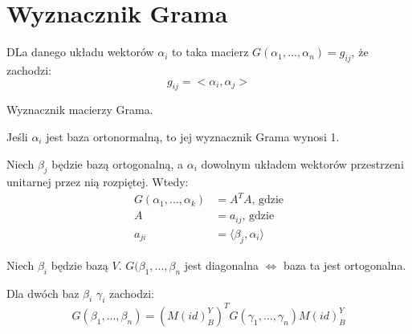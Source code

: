 \section{Wyznacznik Grama}



\begin{definition} 
    DLa danego układu wektorów $\alpha_i$ to taka macierz $G(\alpha_1, ..., \alpha_n) = g_{ij}$, że zachodzi:
    \[ g_{ij} = <\alpha_i, \alpha_j> \]
\end{definition}

\begin{definition} Wyznacznik macierzy Grama. \end{definition}

\begin{corollary}
    Jeśli $\alpha_i$ jest baza ortonormalną, to jej wyznacznik Grama wynosi 1.
\end{corollary}

\begin{statement}
    Niech $\beta_j$ będzie bazą ortogonalną, a $\alpha_i$ dowolnym układem wektorów przestrzeni unitarnej przez nią rozpiętej. Wtedy:
    \begin{align*}
        G(\alpha_1, ..., \alpha_k) &= A^TA\text{, gdzie} \\
        A &= a_{ij}\text{, gdzie} \\
        a_{ji} &= \langle \beta_j, \alpha_i \rangle
    \end{align*}
\end{statement}

\begin{statement}
    Niech $\beta_i$ będzie bazą $V$. $G(\beta_1, ..., \beta_n$ jest diagonalna $\iff$ baza ta jest ortogonalna.
\end{statement}

\begin{statement}
    Dla dwóch baz $\beta_i$ $\gamma_i$ zachodzi:
    \begin{equation*}
        G(\beta_1, ..., \beta_n) = (M(id)_B^Y)^T G(\gamma_1, ..., \gamma_n) M(id)_B^Y
    \end{equation*}
\end{statement}

